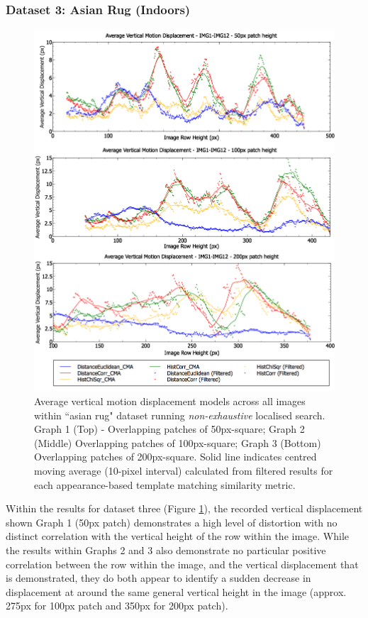 \clearpage
\subsubsection{Dataset 3: Asian Rug (Indoors)}

\begin{figure}[ht!]
\centering
\includegraphics[scale=0.4]{images/results/ex1_results_inside_10cm}
\caption{Average vertical motion displacement models across all images within ``asian rug" dataset running \textit{non-exhaustive} localised search. Graph 1 (Top) - Overlapping patches of 50px-square; Graph 2 (Middle) Overlapping patches of 100px-square; Graph 3 (Bottom) Overlapping patches of 200px-square. Solid line indicates centred moving average (10-pixel interval) calculated from filtered results for each appearance-based template matching similarity metric.}
\label{fig:ex1_1_3}
\end{figure}

Within the results for dataset three (Figure \ref{fig:ex1_1_3}), the recorded vertical displacement shown Graph 1 (50px patch) demonstrates a high level of distortion with no distinct correlation with the vertical height of the row within the image. While the results within Graphs 2 and 3 also demonstrate no particular positive correlation between the row within the image, and the vertical displacement that is demonstrated, they do both appear to identify a sudden decrease in displacement at around the same general vertical height in the image (approx. 275px for 100px patch and 350px for 200px patch).

